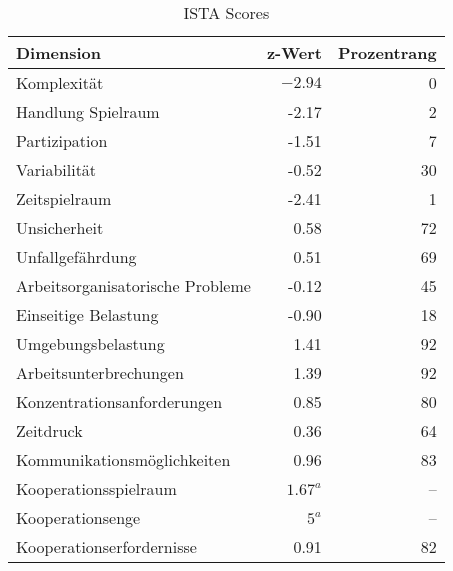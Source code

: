 \documentclass[12pt, a4paper]{article}
\begin{document}
\begin{table}[h]
    \centering
    \begin{threeparttable}
    \caption{ISTA Scores}
    \begin{tabular}{lrr}
        \toprule
        Dimension & z-Wert & Prozentrang \\
        \midrule
        Komplexität & $-2.94$ & 0 \\
        Handlung Spielraum & -2.17 & 2 \\
        Partizipation & -1.51 & 7 \\
        Variabilität & -0.52  & 30 \\
        Zeitspielraum & -2.41 & 1 \\
        Unsicherheit & 0.58 & 72 \\
        Unfallgefährdung & 0.51 & 69 \\
        Arbeitsorganisatorische Probleme & -0.12 & 45 \\
        Einseitige Belastung & -0.90 & 18 \\
        Umgebungsbelastung & 1.41 & 92 \\
        Arbeitsunterbrechungen & 1.39 & 92 \\
        Konzentrationsanforderungen & 0.85 & 80 \\
        Zeitdruck & 0.36 & 64 \\
        Kommunikationsmöglichkeiten & 0.96 & 83 \\
        Kooperationsspielraum & $1.67^a$ & -- \\
        Kooperationsenge & $5^a$ & -- \\
        Kooperationserfordernisse & 0.91 & 82 \\
        \bottomrule
    \end{tabular}
    \end{threeparttable}
\end{table}
\end{document}
